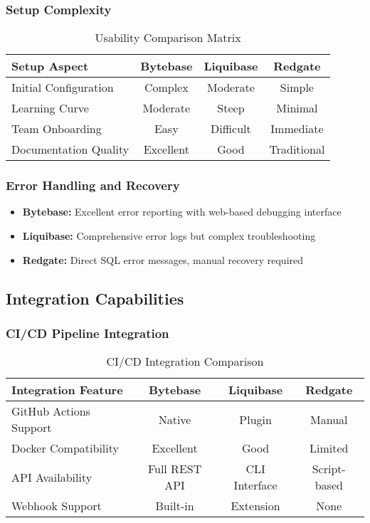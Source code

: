 \subsubsection{Setup Complexity}
\begin{table}[H]
\centering
\begin{tabular}{|l|c|c|c|}
\hline
\textbf{Setup Aspect} & \textbf{Bytebase} & \textbf{Liquibase} & \textbf{Redgate} \\
\hline
Initial Configuration & Complex & Moderate & Simple \\
\hline
Learning Curve & Moderate & Steep & Minimal \\
\hline
Team Onboarding & Easy & Difficult & Immediate \\
\hline
Documentation Quality & Excellent & Good & Traditional \\
\hline
\end{tabular}
\caption{Usability Comparison Matrix}
\label{tab:usability}
\end{table}

\subsubsection{Error Handling and Recovery}
\begin{itemize}
    \item \textbf{Bytebase:} Excellent error reporting with web-based debugging interface
    \item \textbf{Liquibase:} Comprehensive error logs but complex troubleshooting
    \item \textbf{Redgate:} Direct SQL error messages, manual recovery required
\end{itemize}

\subsection{Integration Capabilities}

\subsubsection{CI/CD Pipeline Integration}
\begin{table}[H]
\centering
\begin{tabular}{|l|c|c|c|}
\hline
\textbf{Integration Feature} & \textbf{Bytebase} & \textbf{Liquibase} & \textbf{Redgate} \\
\hline
GitHub Actions Support & Native & Plugin & Manual \\
\hline
Docker Compatibility & Excellent & Good & Limited \\
\hline
API Availability & Full REST API & CLI Interface & Script-based \\
\hline
Webhook Support & Built-in & Extension & None \\
\hline
\end{tabular}
\caption{CI/CD Integration Comparison}
\label{tab:cicd}
\end{table}

